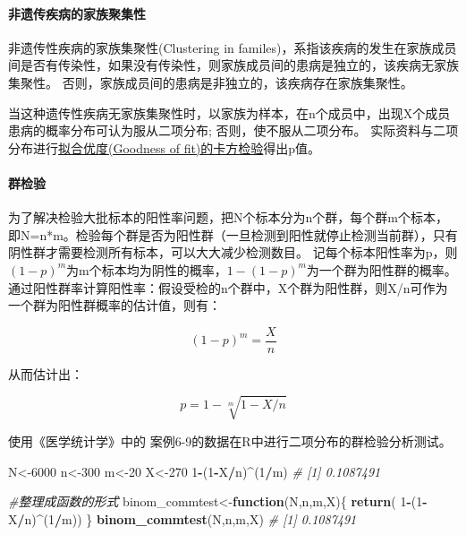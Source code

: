 \documentclass[
]{article}
\newenvironment{Shaded}{\begin{snugshade}}{\end{snugshade}}
\newcommand{\CommentTok}[1]{\textcolor[rgb]{0.56,0.35,0.01}{\textit{#1}}}
\newcommand{\ControlFlowTok}[1]{\textcolor[rgb]{0.13,0.29,0.53}{\textbf{#1}}}
\newcommand{\DecValTok}[1]{\textcolor[rgb]{0.00,0.00,0.81}{#1}}
\newcommand{\KeywordTok}[1]{\textcolor[rgb]{0.13,0.29,0.53}{\textbf{#1}}}
\newcommand{\NormalTok}[1]{#1}
\newcommand{\OperatorTok}[1]{\textcolor[rgb]{0.81,0.36,0.00}{\textbf{#1}}}
\begin{document}
\hypertarget{ux975eux9057ux4f20ux75beux75c5ux7684ux5bb6ux65cfux805aux96c6ux6027}{%
\paragraph{非遗传疾病的家族聚集性}\label{ux975eux9057ux4f20ux75beux75c5ux7684ux5bb6ux65cfux805aux96c6ux6027}}

非遗传性疾病的家族集聚性(Clustering in familes)，系指该疾病的发生在家族成员间是否有传染性，如果没有传染性，则家族成员间的患病是独立的，该疾病无家族集聚性。
否则，家族成员间的患病是非独立的，该疾病存在家族集聚性。

当这种遗传性疾病无家族集聚性时，以家族为样本，在n个成员中，出现X个成员患病的概率分布可认为服从二项分布; 否则，使不服从二项分布。
实际资料与二项分布进行\protect\hyperlink{ux62dfux5408ux4f18ux5ea6ux68c0ux9a8c}{拟合优度(Goodness of fit)的卡方检验}得出p值。

\hypertarget{ux7fa4ux68c0ux9a8c}{%
\paragraph{群检验}\label{ux7fa4ux68c0ux9a8c}}

为了解决检验大批标本的阳性率问题，把N个标本分为n个群，每个群m个标本，即N=n*m。检验每个群是否为阳性群（一旦检测到阳性就停止检测当前群），只有阴性群才需要检测所有标本，可以大大减少检测数目。
记每个标本阳性率为p，则\((1-p)^m\)为m个标本均为阴性的概率，\(1-(1-p)^m\)为一个群为阳性群的概率。
通过阳性群率计算阳性率：假设受检的n个群中，X个群为阳性群，则X/n可作为一个群为阳性群概率的估计值，则有：

\[(1-p)^m=\frac{X}{n}\]

从而估计出：

\[p=1-\sqrt[m]{1-X/n}\]

使用《医学统计学》中的 案例6-9的数据在R中进行二项分布的群检验分析测试。

\begin{Shaded}
\begin{Highlighting}[]
\NormalTok{N<-}\DecValTok{6000}
\NormalTok{n<-}\DecValTok{300}
\NormalTok{m<-}\DecValTok{20}
\NormalTok{X<-}\DecValTok{270}
\DecValTok{1}\OperatorTok{-}\NormalTok{(}\DecValTok{1}\OperatorTok{-}\NormalTok{X}\OperatorTok{/}\NormalTok{n)}\OperatorTok{^}\NormalTok{(}\DecValTok{1}\OperatorTok{/}\NormalTok{m)}
\CommentTok{# [1] 0.1087491}

\CommentTok{#整理成函数的形式}
\NormalTok{binom_commtest<-}\ControlFlowTok{function}\NormalTok{(N,n,m,X)\{}
  \KeywordTok{return}\NormalTok{( }\DecValTok{1}\OperatorTok{-}\NormalTok{(}\DecValTok{1}\OperatorTok{-}\NormalTok{X}\OperatorTok{/}\NormalTok{n)}\OperatorTok{^}\NormalTok{(}\DecValTok{1}\OperatorTok{/}\NormalTok{m))}
\NormalTok{\}}
\KeywordTok{binom_commtest}\NormalTok{(N,n,m,X)}
\CommentTok{# [1] 0.1087491}
\end{Highlighting}
\end{Shaded}
\end{document}
